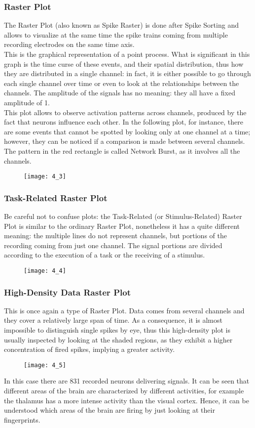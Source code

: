 \subsubsection{Raster Plot}
The Raster Plot (also known as Spike Raster) is done after Spike Sorting and allows to
visualize at the same time the spike trains coming from multiple recording electrodes on
the same time axis.\\
This is the graphical representation of a point process. What is significant in this graph
is the time curse of these events, and their spatial distribution, thus how they are
distributed in a single channel: in fact, it is either possible to go through each single
channel over time or even to look at the relationships between the channels.
The amplitude of the signals has no meaning: they all have a fixed amplitude of 1.\\
This plot allows to observe activation patterns across channels, produced by the fact that
neurons influence each other. In the following plot, for instance, there are some events
that cannot be spotted by looking only at one channel at a time; however, they can be noticed
if a comparison is made between several channels. The pattern in the red rectangle is called
Network Burst, as it involves all the channels.
\begin{figure}[H]
    \texttt{[image: 4\_3]}
    \centering
\end{figure}
\subsubsection{Task-Related Raster Plot}
Be careful not to confuse plots: the Task-Related (or Stimulus-Related) Raster Plot is
similar to the ordinary Raster Plot, nonetheless it has a quite different meaning: the
multiple lines do not represent channels, but portions of the recording coming from just
one channel. The signal portions are divided according to the execution of a task or the
receiving of a stimulus.
\begin{figure}[H]
    \texttt{[image: 4\_4]}
    \centering
\end{figure}
\subsubsection{High-Density Data Raster Plot}
This is once again a type of Raster Plot. Data comes from several channels and they cover a
relatively large span of time. As a consequence, it is almost impossible to distinguish
single spikes by eye, thus this high-density plot is usually inspected by looking at the
shaded regions, as they exhibit a higher concentration of fired spikes, implying a greater
activity.
\begin{figure}[H]
    \texttt{[image: 4\_5]}
    \centering
\end{figure}
In this case there are 831 recorded neurons delivering signals. It can be seen that
different areas of the brain are characterized by different activities, for example the
thalamus has a more intense activity than the visual cortex. Hence, it can be understood
which areas of the brain are firing by just looking at their fingerprints.

